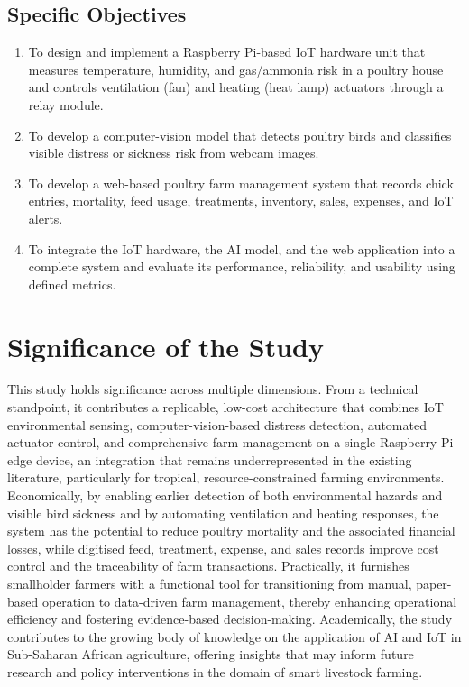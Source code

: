 \documentclass[12pt,a4paper]{report}
\begin{document}
\subsection{Specific Objectives}

\begin{enumerate}[label=\arabic*., leftmargin=1.5cm]
 \item To design and implement a Raspberry Pi-based IoT hardware unit that measures temperature, humidity, and gas/ammonia risk in a poultry house and controls ventilation (fan) and heating (heat lamp) actuators through a relay module.
 \item To develop a computer-vision model that detects poultry birds and classifies visible distress or sickness risk from webcam images.
 \item To develop a web-based poultry farm management system that records chick entries, mortality, feed usage, treatments, inventory, sales, expenses, and IoT alerts.
 \item To integrate the IoT hardware, the AI model, and the web application into a complete system and evaluate its performance, reliability, and usability using defined metrics.
\end{enumerate}

\section{Significance of the Study}

This study holds significance across multiple dimensions. From a technical standpoint, it contributes a replicable, low-cost architecture that combines IoT environmental sensing, computer-vision-based distress detection, automated actuator control, and comprehensive farm management on a single Raspberry Pi edge device, an integration that remains underrepresented in the existing literature, particularly for tropical, resource-constrained farming environments. Economically, by enabling earlier detection of both environmental hazards and visible bird sickness and by automating ventilation and heating responses, the system has the potential to reduce poultry mortality and the associated financial losses, while digitised feed, treatment, expense, and sales records improve cost control and the traceability of farm transactions. Practically, it furnishes smallholder farmers with a functional tool for transitioning from manual, paper-based operation to data-driven farm management, thereby enhancing operational efficiency and fostering evidence-based decision-making. Academically, the study contributes to the growing body of knowledge on the application of AI and IoT in Sub-Saharan African agriculture, offering insights that may inform future research and policy interventions in the domain of smart livestock farming.
\end{document}
